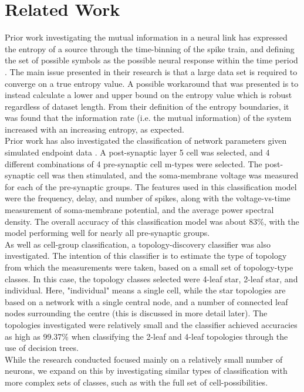 \documentclass[letterpaper, 10 pt, conference]{ieeeconf}  %
\begin{document}
\section{Related Work}
Prior work investigating the mutual information in a neural link has expressed the entropy of a source through the time-binning of the spike train, and defining the set of possible symbols as the possible neural response within the time period \cite{spikeTrainInfo}. The main issue presented in their research is that a large data set is required to converge on a true entropy value. A possible workaround that was presented is to instead calculate a lower and upper bound on the entropy value which is robust regardless of dataset length. From their definition of the entropy boundaries, it was found that the information rate (i.e. the mutual information) of the system increased with an increasing entropy, as expected.\\
Prior work has also investigated the classification of network parameters given simulated endpoint data \cite{ekkyProj}. A post-synaptic layer 5 cell was selected, and 4 different combinations of 4 pre-synaptic cell m-types were selected. The post-synaptic cell was then stimulated, and the soma-membrane voltage was measured for each of the pre-synaptic groups. The features used in this classification model were the frequency, delay, and number of spikes, along with the voltage-vs-time measurement of soma-membrane potential, and the average power spectral density. The overall accuracy of this classification model was about 83\%, with the model performing well for nearly all pre-synaptic groups.\\
As well as cell-group classification, a topology-discovery classifier was also investigated. The intention of this classifier is to estimate the type of topology from which the measurements were taken, based on a small set of topology-type classes. In this case, the topology classes selected were {4-leaf star, 2-leaf star, and individual}. Here, "individual" means a single cell, while the star topologies are based on a network with a single central node, and a number of connected leaf nodes surrounding the centre (this is discussed in more detail later). The topologies investigated were relatively small and the classifier achieved accuracies as high as 99.37\% when classifying the 2-leaf and 4-leaf topologies through the use of decision trees.\\
While the research conducted focused mainly on a relatively small number of neurons, we expand on this by investigating similar types of classification with more complex sets of classes, such as with the full set of cell-possibilities.\\
\end{document}
